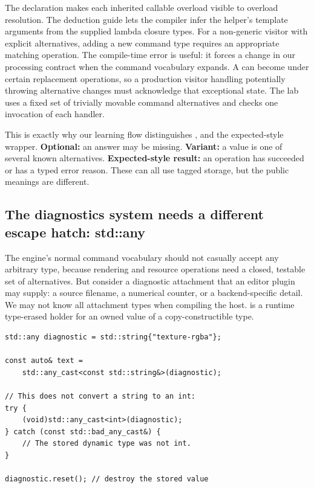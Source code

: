 The  declaration makes each inherited callable overload visible to overload resolution. The deduction guide lets the compiler infer the helper's template arguments from the supplied lambda closure types. For a non-generic visitor with explicit alternatives, adding a new command type requires an appropriate matching operation. The compile-time error is useful: it forces a change in our processing contract when the command vocabulary expands. A  can become  under certain replacement operations, so a production visitor handling potentially throwing alternative changes must acknowledge that exceptional state. The lab uses a fixed set of trivially movable command alternatives and checks one invocation of each handler.

This is exactly why our learning flow distinguishes ,  and the expected-style wrapper. \textbf{Optional:} an answer may be missing. \textbf{Variant:} a value is one of several known alternatives. \textbf{Expected-style result:} an operation has succeeded or has a typed error reason. These can all use tagged storage, but the public meanings are different.

\subsection{The diagnostics system needs a different escape hatch: std::any}\label{01-foundations-i-ch006-the-diagnostics-system-needs-a-different-escape-hatch-stdany}

\hypertarget{01-foundations-i-ch006-the-diagnostics-system-needs-a-different-escape-hatch-stdany}{}

The engine's normal command vocabulary should not casually accept any arbitrary type, because rendering and resource operations need a closed, testable set of alternatives. But consider a diagnostic attachment that an editor plugin may supply: a source filename, a numerical counter, or a backend-specific detail. We may not know all attachment types when compiling the host.  is a runtime type-erased holder for an owned value of a copy-constructible type.

\begin{verbatim}
std::any diagnostic = std::string{"texture-rgba"};

const auto& text =
    std::any_cast<const std::string&>(diagnostic);

// This does not convert a string to an int:
try {
    (void)std::any_cast<int>(diagnostic);
} catch (const std::bad_any_cast&) {
    // The stored dynamic type was not int.
}

diagnostic.reset(); // destroy the stored value
\end{verbatim}

